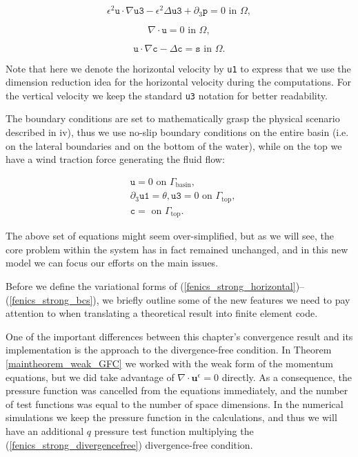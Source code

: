 \documentclass[12pt]{report}
\numberwithin{theorem}{chapter}
\numberwithin{corollary}{chapter}
\numberwithin{lemma}{chapter}
\numberwithin{remark}{chapter}
\numberwithin{definition}{chapter}
\numberwithin{prop}{chapter}
\begin{document}
\begin{equation} \label{fenics_strong_vertical}
  \epsilon^2 \mathbf{\texttt{u}} \cdot \nabla \texttt{u3} - \epsilon^2 \Delta \texttt{u3} + \partial_3 \texttt{p}  = 0 \text{ in } \Omega,
\end{equation}
    
\begin{equation} \label{fenics_strong_divergencefree}
  \nabla \cdot \mathbf{\texttt{u}} = 0 \text{ in } \Omega,
\end{equation}

\begin{equation} \label{fenics_strong_concentration}
  \texttt{u} \cdot \nabla \texttt{c} - \Delta \texttt{c} = \texttt{s} \text{ in } \Omega.
\end{equation}

Note that here we denote the horizontal velocity by \texttt{u1} to express that we use the dimension reduction idea for the horizontal velocity during the computations. For the vertical velocity we keep the standard \texttt{u3} notation for better readability.

The boundary conditions are set to mathematically grasp the physical scenario described in iv), thus we use no-slip boundary conditions on the entire basin (i.e. on the lateral boundaries and on the bottom of the water), while on the top we have a wind traction force generating the fluid flow:

\begin{equation} \label{fenics_strong_bcs}
\begin{split}
& \mathbf{\texttt{u}} = 0 \text{ on } \Gamma_{\text{basin}}, \\
& \partial_3 \texttt{u1} = \theta, \texttt{u3} = 0 \text{ on } \Gamma_{\text{top}}, \\
& \texttt{c} = \text{ on } \Gamma_{\text{top}}.
\end{split}
\end{equation}

The above set of equations might seem over-simplified, but as we will see, the core problem within the system has in fact remained unchanged, and in this new model we can focus our efforts on the main issues.

Before we define the variational forms of (\ref{fenics_strong_horizontal})--(\ref{fenics_strong_bcs}), we briefly outline some of the new features we need to pay attention to when translating a theoretical result into finite element code.

One of the important differences between this chapter's convergence result and its implementation is the approach to the divergence-free condition. In Theorem \ref{maintheorem_weak_GFC} we worked with the weak form of the momentum equations, but we did take advantage of $\nabla \cdot \mathbf{u}^\epsilon = 0$ directly. As a consequence, the pressure function was cancelled from the equations immediately, and the number of test functions was equal to the number of space dimensions. In the numerical simulations we keep the pressure function in the calculations, and thus we will have an additional $q$ pressure test function multiplying the (\ref{fenics_strong_divergencefree}) divergence-free condition.
\end{document}
